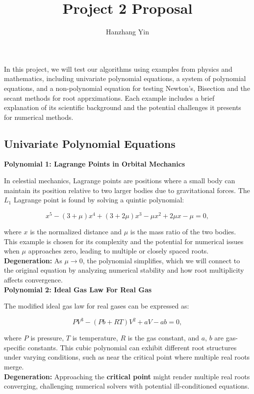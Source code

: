 \documentclass[12pt]{article}
\title{\vspace{-2cm}Project 2 Proposal}
\author{Hanzhang Yin}
\begin{document}
\maketitle

\noindent In this project, we will test our algorithms using examples from physics and mathematics, including univariate polynomial equations, a system of polynomial equations, and a non-polynomial equation for testing Newton's, Bisection and the secant methods for root apprximations. Each example includes a brief explanation of its scientific background and the potential challenges it presents for numerical methods.

\subsection*{Univariate Polynomial Equations}

\textbf{Polynomial 1: Lagrange Points in Orbital Mechanics}

\noindent In celestial mechanics, Lagrange points are positions where a small body can maintain its position relative to two larger bodies due to gravitational forces. The \( L_1 \) Lagrange point is found by solving a quintic polynomial:

\[
    x^5 - (3 + \mu)x^4 + (3 + 2\mu)x^3 - \mu x^2 + 2\mu x - \mu = 0,
\]

\noindent where \( x \) is the normalized distance and \( \mu \) is the mass ratio of the two bodies. This example is chosen for its complexity and the potential for numerical issues when \( \mu \) approaches zero, leading to multiple or closely spaced roots.
\\
\textbf{Degeneration:} As \( \mu \rightarrow 0 \), the polynomial simplifies, which we will connect to the original equation by analyzing numerical stability and how root multiplicity affects convergence.
\\
\textbf{Polynomial 2: Ideal Gas Law For Real Gas}

\noindent The modified ideal gas law for real gases can be expressed as:

\[
    P V^3 - (P b + R T)V^2 + a V - a b = 0,
\]

\noindent where \( P \) is pressure, \( T \) is temperature, \( R \) is the gas constant, and \( a \), \( b \) are gas-specific constants. This cubic polynomial can exhibit different root structures under varying conditions, such as near the critical point where multiple real roots merge.
\\
\textbf{Degeneration:} Approaching the \textbf{critical point} might render multiple real roots converging, challenging numerical solvers with potential ill-conditioned equations.
\end{document}
